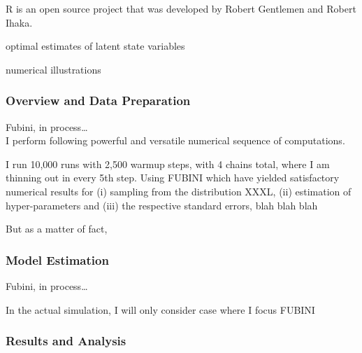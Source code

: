 \documentclass[a4paper,11pt,english]{article}
\begin{document}
		R is an open source project that was developed by Robert Gentlemen and Robert Ihaka. 
			
		optimal estimates of latent state variables		
			
		numerical illustrations
			
			\subsubsection{Overview and Data Preparation}


		Fubini, in process\ldots \\
		
		I perform  following powerful and versatile numerical sequence of computations.
		
		I run 10,000 runs with 2,500 warmup steps, with 4 chains total, where I am thinning out in every 5th step. Using FUBINI which have yielded 
		satisfactory numerical results for (i) sampling from the distribution XXXL, (ii) estimation of hyper-parameters and (iii) the respective standard
		errors, blah blah blah   
		
		But as a matter of fact,

			\subsubsection{Model Estimation}

			Fubini, in process\ldots
			
			In the actual simulation, I will only consider case where I focus FUBINI

			\subsubsection{Results and Analysis}
			
\end{document}

